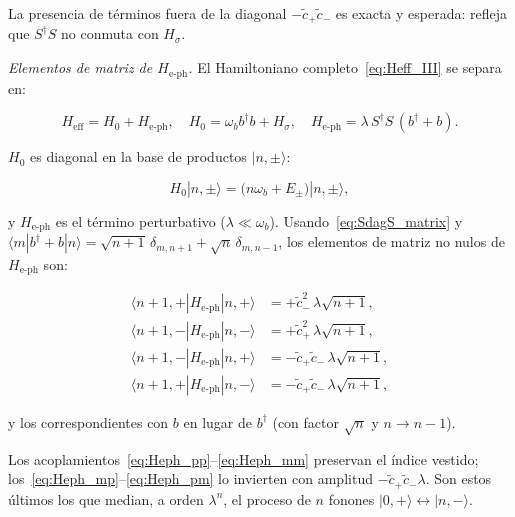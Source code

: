 \documentclass[12pt]{article}
\begin{document}
\noindent
La presencia de t\'erminos fuera de la diagonal $-\tilde{c}_+\tilde{c}_-$
es exacta y esperada: refleja que $S^\dagger S$ no conmuta con
$H_\sigma$.

\medskip
\noindent
\textit{Elementos de matriz de $H_\mathrm{e\text{-}ph}$.}
El Hamiltoniano completo~\eqref{eq:Heff_III} se separa en:

\begin{equation}
	H_\mathrm{eff} = H_0 + H_\mathrm{e\text{-}ph},
	\quad
	H_0 = \omega_b b^\dagger b + H_\sigma,
	\quad
	H_\mathrm{e\text{-}ph} = \lambda\,S^\dagger S\,(b^\dagger + b).
	\label{eq:H0_Heph}
\end{equation}

$H_0$ es diagonal en la base de productos $|n,\pm\rangle$:

\begin{equation}
	H_0|n,\pm\rangle = \bigl(n\omega_b + E_\pm\bigr)|n,\pm\rangle,
	\label{eq:H0_diagonal}
\end{equation}

y $H_\mathrm{e\text{-}ph}$ es el t\'ermino perturbativo ($\lambda \ll \omega_b$).
Usando~\eqref{eq:SdagS_matrix} y
$\langle m|b^\dagger+b|n\rangle = \sqrt{n+1}\,\delta_{m,n+1}+\sqrt{n}\,\delta_{m,n-1}$,
los elementos de matriz no nulos de $H_\mathrm{e\text{-}ph}$ son:

\begin{align}
	\langle n{+}1,{+}|H_\mathrm{e\text{-}ph}|n,{+}\rangle
	&= +\tilde{c}_-^2\,\lambda\sqrt{n+1},
	\label{eq:Heph_pp}\\[4pt]
	\langle n{+}1,{-}|H_\mathrm{e\text{-}ph}|n,{-}\rangle
	&= +\tilde{c}_+^2\,\lambda\sqrt{n+1},
	\label{eq:Heph_mm}\\[4pt]
	\langle n{+}1,{-}|H_\mathrm{e\text{-}ph}|n,{+}\rangle
	&= -\tilde{c}_+\tilde{c}_-\,\lambda\sqrt{n+1},
	\label{eq:Heph_mp}\\[4pt]
	\langle n{+}1,{+}|H_\mathrm{e\text{-}ph}|n,{-}\rangle
	&= -\tilde{c}_+\tilde{c}_-\,\lambda\sqrt{n+1},
	\label{eq:Heph_pm}
\end{align}

\noindent
y los correspondientes con $b$ en lugar de $b^\dagger$
(con factor $\sqrt{n}$ y $n\to n-1$).

\medskip
\noindent
Los acoplamientos~\eqref{eq:Heph_pp}--\eqref{eq:Heph_mm} preservan
el \'indice vestido; los~\eqref{eq:Heph_mp}--\eqref{eq:Heph_pm}
lo invierten con amplitud $-\tilde{c}_+\tilde{c}_-\lambda$.
Son estos \'ultimos los que median, a orden $\lambda^n$, el proceso
de $n$ fonones $|0,{+}\rangle \leftrightarrow |n,{-}\rangle$.
\end{document}
